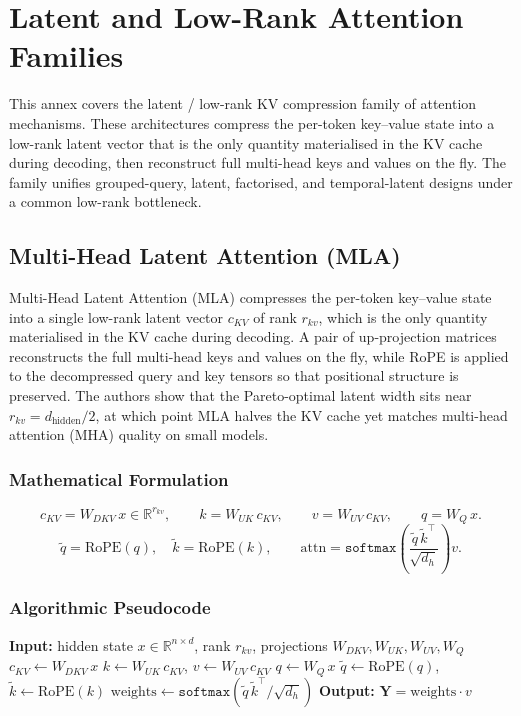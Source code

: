 \section{Latent and Low-Rank Attention Families}
\label{sec:annex-latent}

This annex covers the latent / low-rank KV compression family of attention mechanisms. These architectures compress the per-token key--value state into a low-rank latent vector that is the only quantity materialised in the KV cache during decoding, then reconstruct full multi-head keys and values on the fly. The family unifies grouped-query, latent, factorised, and temporal-latent designs under a common low-rank bottleneck.

\subsection{Multi-Head Latent Attention (MLA)}
Multi-Head Latent Attention (MLA) \citep{mehta_mla_2025} compresses the per-token key--value state into a single low-rank latent vector $c_{KV}$ of rank $r_{kv}$, which is the only quantity materialised in the KV cache during decoding. A pair of up-projection matrices reconstructs the full multi-head keys and values on the fly, while RoPE is applied to the decompressed query and key tensors so that positional structure is preserved. The authors show that the Pareto-optimal latent width sits near $r_{kv} = d_{\text{hidden}} / 2$, at which point MLA halves the KV cache yet matches multi-head attention (MHA) quality on small models.

\subsubsection{Mathematical Formulation}
\[
c_{KV} = W_{DKV}\, x \in \mathbb{R}^{r_{kv}}, \qquad
k = W_{UK}\, c_{KV}, \qquad
v = W_{UV}\, c_{KV}, \qquad
q = W_{Q}\, x.
\]
\[
\tilde q = \text{RoPE}(q), \quad \tilde k = \text{RoPE}(k), \qquad
\text{attn} = \texttt{softmax}\!\left(\frac{\tilde q\, \tilde k^\top}{\sqrt{d_h}}\right) v.
\]

\subsubsection{Algorithmic Pseudocode}
\begin{algorithmic}[1]
\State \textbf{Input:} hidden state $x \in \mathbb{R}^{n \times d}$, rank $r_{kv}$, projections $W_{DKV}, W_{UK}, W_{UV}, W_{Q}$
\State $c_{KV} \gets W_{DKV}\, x$ 
\State $k \gets W_{UK}\, c_{KV}$, \quad $v \gets W_{UV}\, c_{KV}$ 
\State $q \gets W_{Q}\, x$
\State $\tilde q \gets \text{RoPE}(q)$, \quad $\tilde k \gets \text{RoPE}(k)$ 
\State $\text{weights} \gets \texttt{softmax}(\tilde q\, \tilde k^\top / \sqrt{d_h})$
\State \textbf{Output:} $\mathbf{Y} = \text{weights} \cdot v$
\end{algorithmic}

